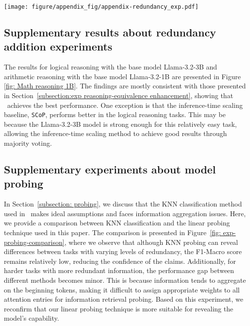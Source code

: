 \begin{figure*}[t]
    \centering
    \texttt{[image: figure/appendix\_fig/appendix-redundancy\_exp.pdf]}
    \caption{Evaluations with respect to different query variations. Each figure refers to one permutation order type, the x-axis represents the number of redundancies of the test set, and the y-axis represents the accuracy of final answers. For each dataset, we report the accuracy value over a dataset with a size of $200$.}
    \label{fig: Math reasoning 1B}
\end{figure*}

\subsection{Supplementary results about redundancy addition experiments}
\label{subsection:supplementary-exp-redundancy}
The results for logical reasoning with the base model {Llama-3.2-3B} and arithmetic reasoning with the base model {Llama-3.2-1B} are presented in Figure \ref{fig: Math reasoning 1B}. The findings are mostly consistent with those presented in Section~\ref{subsection:exp reasoning-equivalence enhancement}, showing that \method\ achieves the best performance. 
One exception is that the inference-time scaling baseline, \texttt{SCoP}, performs better in the logical reasoning tasks. This may be because the {Llama-3.2-3B} model is strong enough for this relatively easy task, allowing the inference-time scaling method to achieve good results through majority voting.



\subsection{Supplementary experiments about model probing}
\label{subsection: appendix-model-probing}
In Section~\ref{subsection: probing}, we discuss that the KNN classification method used in~\cite{hou2023towards} makes ideal assumptions and faces information aggregation issues. Here, we provide a comparison between KNN classification and the linear probing technique used in this paper. The comparison is presented in Figure~\ref{fig: exp-probing-comparison}, where we observe that although KNN probing can reveal differences between tasks with varying levels of redundancy, the F1-Macro score remains relatively low, reducing the confidence of the claims. Additionally, for harder tasks with more redundant information, the performance gap between different methods becomes minor. This is because information tends to aggregate on the beginning tokens, making it difficult to assign appropriate weights to all attention entries for information retrieval probing. Based on this experiment, we reconfirm that our linear probing technique is more suitable for revealing the model's capability.


